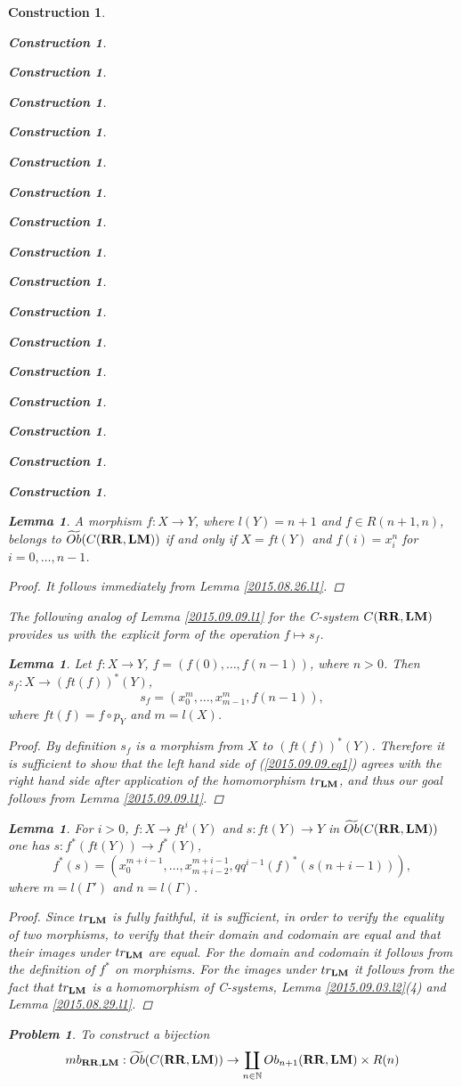 \documentclass[onecolumn,12pt]{amsart}
\newtheorem{lemma}[proposition]{Lemma}
\numberwithin{proposition}{subsection}
\newtheorem{problem}[proposition]{Problem}
\newtheorem{construction}[proposition]{Construction}
\newcommand{\sr}{\rightarrow}
\newcommand{\nn}{{\mathbb N}}
\newcommand{\nat}{\nn}
\newcommand{\wt}{\widetilde}
\newcommand{\mbind}[1]{{#1^*}}
\newcommand{\RR}{{\bf RR}}
\newcommand{\LM}{{\bf LM}}
\begin{document}
\begin{construction}
\begin{construction}
\begin{construction}
\begin{construction}
\begin{construction}
\begin{construction}
\begin{construction}
\begin{construction}
\begin{construction}
\begin{construction}
\begin{construction}
\begin{construction}
\begin{construction}
\begin{construction}
\begin{construction}
\begin{construction}
\begin{construction}
%
\begin{lemma}
\label{2015.08.22.l5} A morphism $f:X\sr Y$, where $l(Y)=n+1$ and $f\in
R(n+1,n)$, belongs to $\wt{Ob}(C(\RR,\LM))$ if and only if $X=ft(Y)$ and
$f(i)=x^n_i$ for $i=0,\dots,n-1$.
\end{lemma}
%
\begin{proof}
It follows immediately from Lemma \ref{2015.08.26.l1}.
\end{proof}
%
The following analog of Lemma \ref{2015.09.09.l1} for the C-system $C(\RR,\LM)$
provides us with the explicit form of the operation $f\mapsto s_f$.
%
\begin{lemma}
\label{2015.09.09.l2}
Let $f:X\sr Y$, $f=(f(0),\dots,f(n-1))$, where $n>0$. Then $s_f:X\sr (ft(f))^*(Y)$,
%
\begin{equation}\label{2015.09.09.eq1}
s_f=(x_0^{m},\dots,x_{m-1}^{m},f(n-1)),
\end{equation}%
%
where $ft(f)=f\circ p_Y$ and $m=l(X)$. 
\end{lemma}
%
\begin{proof}
By definition $s_f$ is a morphism from $X$ to $(ft(f))^*(Y)$. Therefore it is
sufficient to show that the left hand side of (\ref{2015.09.09.eq1}) agrees
with the right hand side after application of the homomorphism $tr_{\LM}$, and thus
our goal follows from Lemma \ref{2015.09.09.l1}.
\end{proof}
%
\begin{lemma}
\label{2015.09.03.l1}
For $i>0$, $f:X\sr ft^i(Y)$ and $s:ft(Y)\sr Y$ in $\wt{Ob}(C(\RR,\LM))$ one has $s:f^*(ft(Y))\sr f^*(Y)$,
%
$$f^*(s)=(x_0^{m+i-1},\dots,x_{m+i-2}^{m+i-1},\mbind{qq^{i-1}(f)}(s(n+i-1))),$$
%
where $m=l(\Gamma')$ and $n=l(\Gamma)$.
\end{lemma}
%
\begin{proof}
Since $tr_{\LM}$ is fully faithful, it is sufficient, in order to verify the
equality of two morphisms, to verify that their domain and codomain are equal
and that their images under $tr_{\LM}$ are equal. For the domain and codomain
it follows from the definition of $f^*$ on morphisms. For the images under
$tr_{\LM}$ it follows from the fact that $tr_{\LM}$ is a homomorphism of
C-systems, Lemma \ref{2015.09.03.l2}(4) and Lemma \ref{2015.08.29.l1}.
\end{proof}
%
\begin{problem}
\label{2015.08.22.prob1}
To construct a bijection
%
\begin{equation}
\label{2009.10.15.eq2}
mb_{\RR,\LM}:\wt{Ob}(C(\RR,\LM))\sr \coprod_{n\in\nat} Ob_{n+1}(\RR,\LM)\times R(n)

\end{equation}
\end{problem}
\end{construction}
\end{construction}
\end{construction}
\end{construction}
\end{construction}
\end{construction}
\end{construction}
\end{construction}
\end{construction}
\end{construction}
\end{construction}
\end{construction}
\end{construction}
\end{construction}
\end{construction}
\end{construction}
\end{construction}
\end{document}
